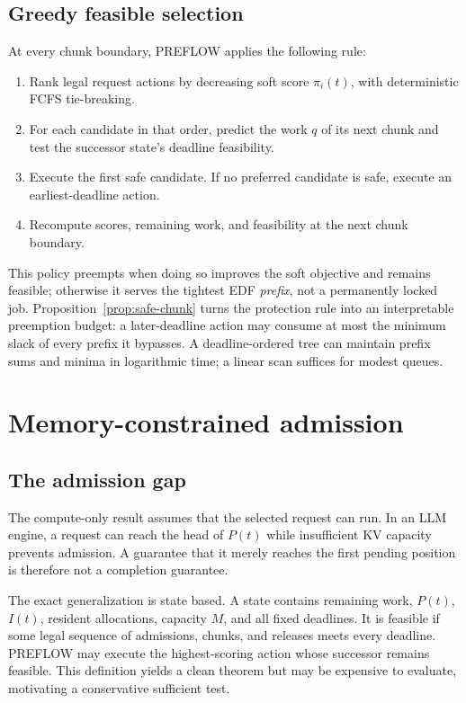 \documentclass{article}
\newcommand{\preflow}{\textnormal{\textsc{PREFLOW}}}
\begin{document}
\subsection{Greedy feasible selection}

At every chunk boundary, \preflow{} applies the following rule:
\begin{enumerate}
    \item Rank legal request actions by decreasing soft score $\pi_i(t)$, with
    deterministic FCFS tie-breaking.
    \item For each candidate in that order, predict the work $q$ of its next
    chunk and test the successor state's deadline feasibility.
    \item Execute the first safe candidate.  If no preferred candidate is safe,
    execute an earliest-deadline action.
    \item Recompute scores, remaining work, and feasibility at the next chunk
    boundary.
\end{enumerate}

This policy preempts when doing so improves the soft objective and remains
feasible; otherwise it serves the tightest EDF \emph{prefix}, not a permanently
locked job.  Proposition~\ref{prop:safe-chunk} turns the protection rule into an
interpretable preemption budget: a later-deadline action may consume at most the
minimum slack of every prefix it bypasses.  A deadline-ordered tree can maintain
prefix sums and minima in logarithmic time; a linear scan suffices for modest
queues.

\section{Memory-constrained admission}
\label{sec:admission}

\subsection{The admission gap}

The compute-only result assumes that the selected request can run.  In an LLM
engine, a request can reach the head of $P(t)$ while insufficient KV capacity
prevents admission.  A guarantee that it merely reaches the first pending
position is therefore not a completion guarantee.

The exact generalization is state based.  A state contains remaining work,
$P(t)$, $I(t)$, resident allocations, capacity $M$, and all fixed deadlines.  It
is feasible if some legal sequence of admissions, chunks, and releases meets
every deadline.  \preflow{} may execute the highest-scoring action whose
successor remains feasible.  This definition yields a clean theorem but may be
expensive to evaluate, motivating a conservative sufficient test.
\end{document}
